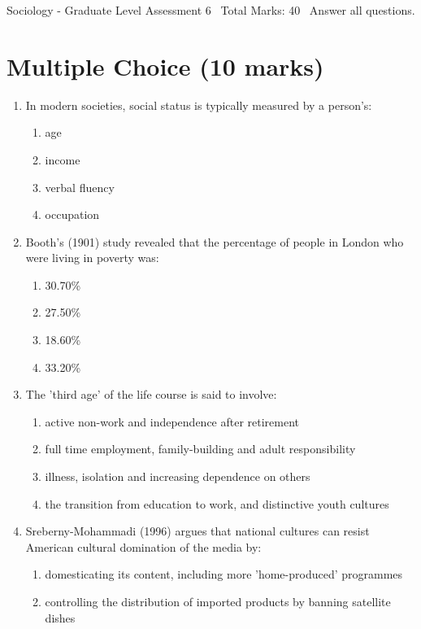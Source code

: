 \documentclass[12pt]{article}
\begin{document}
\begin{center}
Sociology - Graduate Level Assessment 6 \
Total Marks: 40 \
Answer all questions.
\end{center}

\section*{Multiple Choice (10 marks)}
\begin{enumerate}[label=\arabic*.]
\item In modern societies, social status is typically measured by a person's:
\begin{enumerate}[label=(\alph*)]
    \item age
    \item income
    \item verbal fluency
    \item occupation
\end{enumerate}
\item Booth's (1901) study revealed that the percentage of people in London who were living in poverty was:
\begin{enumerate}[label=(\alph*)]
    \item 30.70\%
    \item 27.50\%
    \item 18.60\%
    \item 33.20\%
\end{enumerate}
\item The 'third age' of the life course is said to involve:
\begin{enumerate}[label=(\alph*)]
    \item active non-work and independence after retirement
    \item full time employment, family-building and adult responsibility
    \item illness, isolation and increasing dependence on others
    \item the transition from education to work, and distinctive youth cultures
\end{enumerate}
\item Sreberny-Mohammadi (1996) argues that national cultures can resist American cultural domination of the media by:
\begin{enumerate}[label=(\alph*)]
    \item domesticating its content, including more 'home-produced' programmes
    \item controlling the distribution of imported products by banning satellite dishes

\end{enumerate}
\end{enumerate}
\end{document}
